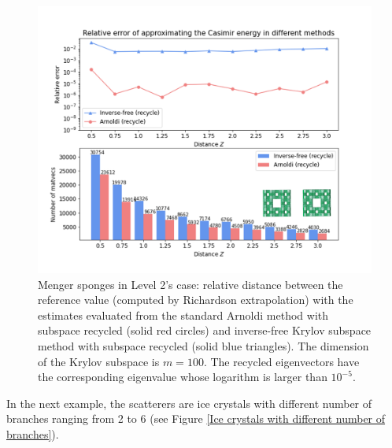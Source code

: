 \begin{figure}[H]
        \centering
        \includegraphics[width = \textwidth]{figures/level2_rel_err.png}
        \caption{Menger sponges in Level 2's case: relative distance between the reference value (computed by Richardson extrapolation) with the estimates evaluated from the standard Arnoldi 
        method with subspace recycled (solid red circles) and inverse-free Krylov subspace method 
        with subspace recycled (solid blue triangles). The dimension of the Krylov subspace is $m = 100$. The recycled eigenvectors have the corresponding eigenvalue 
        whose logarithm is larger than $10^{-5}$.}
\end{figure}


In the next example, the scatterers are ice crystals with different number of branches ranging from 2 to 6 (see Figure \ref{Ice crystals with different number of branches}).

